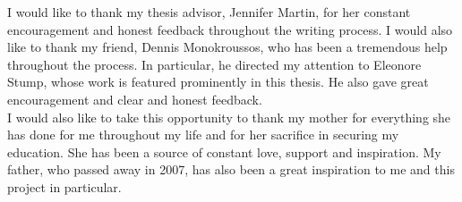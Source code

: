I would like to thank my thesis advisor, Jennifer Martin, for her constant encouragement and honest feedback throughout the writing process. I would also like to thank my friend, Dennis Monokroussos, who has been a tremendous help throughout the process. In particular, he directed my attention to Eleonore Stump, whose work is featured prominently in this thesis. He also gave great encouragement and clear and honest feedback.\\

I would also like to take this opportunity to thank my mother for everything she has done for me throughout my life and for her sacrifice in securing my education. She has been a source of constant love, support and inspiration. My father, who passed away in 2007, has also been a great inspiration to me and this project in particular. \\

